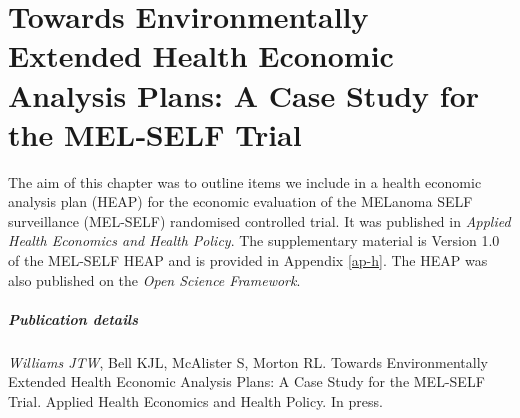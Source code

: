 \chapter{Towards Environmentally Extended Health Economic Analysis Plans: A Case Study for the MEL‑SELF Trial}
\label{ch-8}

The aim of this chapter was to outline items we include in a health economic analysis plan (HEAP) for the economic evaluation of the MELanoma SELF surveillance (MEL-SELF) randomised controlled trial. It was published in \textit{Applied Health Economics and Health Policy}. The supplementary material is Version 1.0 of the MEL-SELF HEAP and is provided in Appendix \ref{ap-h}. The HEAP was also published on the \textit{Open Science Framework}.

\paragraph*{Publication details}
\textit{Williams JTW}, Bell KJL, McAlister S, Morton RL. Towards Environmentally Extended Health Economic Analysis Plans: A Case Study for the MEL-SELF Trial. Applied Health Economics and Health Policy. In press.











